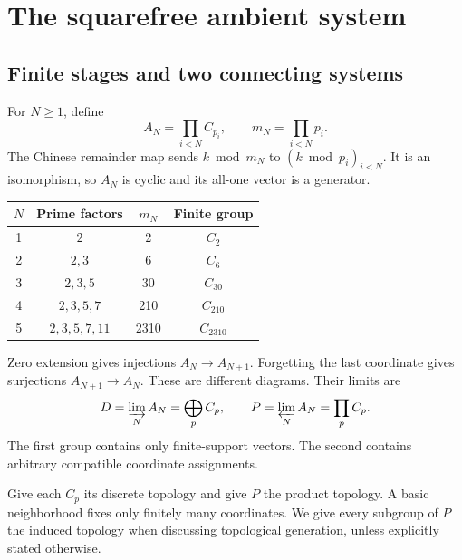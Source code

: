\chapter{The squarefree ambient system}
\label{ch:ambient}

\section{Finite stages and two connecting systems}
For $N\ge1$, define
\[
A_N=\prod_{i<N}C_{p_i},\qquad m_N=\prod_{i<N}p_i.
\]
The Chinese remainder map sends $k\bmod m_N$ to $(k\bmod p_i)_{i<N}$. It is an isomorphism, so $A_N$ is cyclic and its all-one vector is a generator.

\begin{center}
\begin{tabular}{@{}cccc@{}}
\toprule
$N$&Prime factors&$m_N$&Finite group\\\midrule
1&$2$&2&$C_2$\\
2&$2,3$&6&$C_6$\\
3&$2,3,5$&30&$C_{30}$\\
4&$2,3,5,7$&210&$C_{210}$\\
5&$2,3,5,7,11$&2310&$C_{2310}$\\\bottomrule
\end{tabular}
\end{center}

Zero extension gives injections $A_N\to A_{N+1}$. Forgetting the last coordinate gives surjections $A_{N+1}\to A_N$. These are different diagrams. Their limits are
\[
D=\varinjlim_N A_N=\bigoplus_p C_p,
\qquad
P=\varprojlim_N A_N=\prod_p C_p.
\]
The first group contains only finite-support vectors. The second contains arbitrary compatible coordinate assignments.

Give each $C_p$ its discrete topology and give $P$ the product topology. A basic neighborhood fixes only finitely many coordinates. We give every subgroup of $P$ the induced topology when discussing topological generation, unless explicitly stated otherwise.

